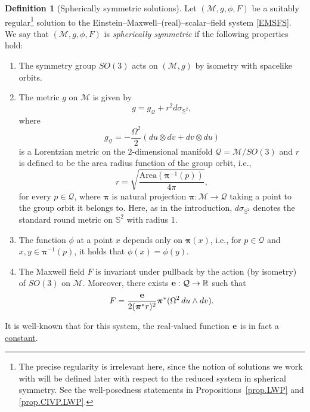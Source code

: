 \documentclass[10pt, reqno]{amsart}
\theoremstyle{definition}
\newtheorem{definition}[theorem]{Definition}
\theoremstyle{remark}
\numberwithin{equation}{section}
\newcommand{\0}{\emptyset}
\newcommand{\Omg}{\Omega}
\newcommand{\bfe}{{\bf e}}
\newcommand{\calM}{\mathcal M}
\newcommand{\f}{\frac}
\begin{document}
\begin{definition}[Spherically symmetric solutions]\label{def.SS}
Let $(\mathcal M,g,\phi,F)$ be a suitably regular\footnote{The precise regularity is irrelevant here, since the notion of solutions we work with will be defined later with respect to the reduced system in spherical symmetry. See the well-posedness statements in Propositions~\ref{prop.LWP} and \ref{prop.CIVP.LWP}.} solution to the Einstein--Maxwell--(real)--scalar--field system \eqref{EMSFS}. We say that $(\mathcal M,g,\phi,F)$ is \emph{spherically symmetric} if the following properties hold:
\begin{enumerate}
\item The symmetry group $SO(3)$ acts on $(\mathcal M,g)$ by isometry with spacelike orbits.
\item The metric $g$ on $\mathcal M$ is given by
\begin{equation}\label{SS.metric.1}
g=g_{\mathcal Q}+r^2 d\sigma_{\mathbb S^2},
\end{equation}
where
\begin{equation}\label{SS.metric.2}
g_{\mathcal Q}=-\f{\Omg^2 }{2}(du\otimes dv+dv\otimes du)
\end{equation}
is a Lorentzian metric on the $2$-dimensional manifold $\mathcal Q=\mathcal M/SO(3)$ and $r$ is defined to be the area radius function of the group orbit, i.e.,
$$r=\sqrt{\f{\mbox{Area}({\boldsymbol \pi}^{-1}(p))}{4\pi}},$$
for every $p\in \mathcal Q$, where ${\boldsymbol \pi}$ is natural projection ${\boldsymbol \pi}:\mathcal M\to \mathcal Q$ taking a point to the group orbit it belongs to. Here, as in the introduction, $d\sigma_{\mathbb S^2}$ denotes the standard round metric on $\mathbb S^2$ with radius $1$.
\item The function $\phi$ at a point $x$ depends only on ${\boldsymbol \pi}(x)$, i.e., for $p\in \mathcal Q$ and $x,y\in {\boldsymbol \pi}^{-1}(p)$, it holds that $\phi(x)=\phi(y)$.
\item The Maxwell field $F$ is invariant under pullback by the action (by isometry) of $SO(3)$ on $\calM$.
Moreover, there exists ${\bf e}:\mathcal Q\to \mathbb R$ such that
$$F=\f{\bfe}{2({\boldsymbol \pi}^* r)^2}{\boldsymbol \pi}^*(\Omg^2\,du\wedge dv).$$
\end{enumerate}
\end{definition}


It is well-known that for this system, the real-valued function ${\bf e}$ is in fact a \underline{constant}.
\end{document}
